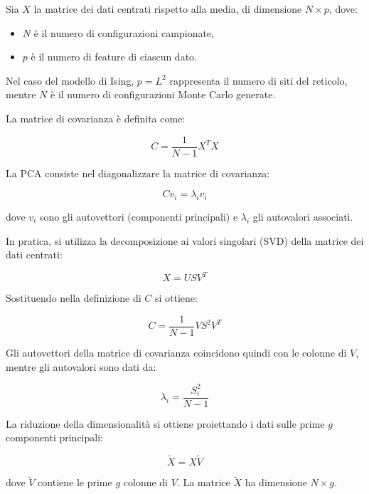 Sia $X$ la matrice dei dati centrati rispetto alla media, di dimensione $N \times p$, dove:
\begin{itemize}
    \item $N$ è il numero di configurazioni campionate,
    \item $p$ è il numero di feature di ciascun dato.
\end{itemize}

Nel caso del modello di Ising, $p = L^2$ rappresenta il numero di siti del reticolo, mentre $N$ è il numero di configurazioni Monte Carlo generate.

La matrice di covarianza è definita come:

\begin{equation}
    C = \frac{1}{N-1} X^T X
\end{equation}

La PCA consiste nel diagonalizzare la matrice di covarianza:

\begin{equation}
    C v_i = \lambda_i v_i
\end{equation}

dove $v_i$ sono gli autovettori (componenti principali) e $\lambda_i$ gli autovalori associati.

In pratica, si utilizza la decomposizione ai valori singolari (SVD) della matrice dei dati centrati:

\begin{equation}
    X = U S V^T
\end{equation}

Sostituendo nella definizione di $C$ si ottiene:

\begin{equation}
    C = \frac{1}{N-1} V S^2 V^T
\end{equation}

Gli autovettori della matrice di covarianza coincidono quindi con le colonne di $V$, mentre gli autovalori sono dati da:

\begin{equation}
    \lambda_i = \frac{S_i^2}{N-1}
\end{equation}

La riduzione della dimensionalità si ottiene proiettando i dati sulle prime $g$ componenti principali:

\begin{equation}
    \tilde{X} = X \tilde{V}
\end{equation}

dove $\tilde{V}$ contiene le prime $g$ colonne di $V$.  
La matrice $\tilde{X}$ ha dimensione $N \times g$.